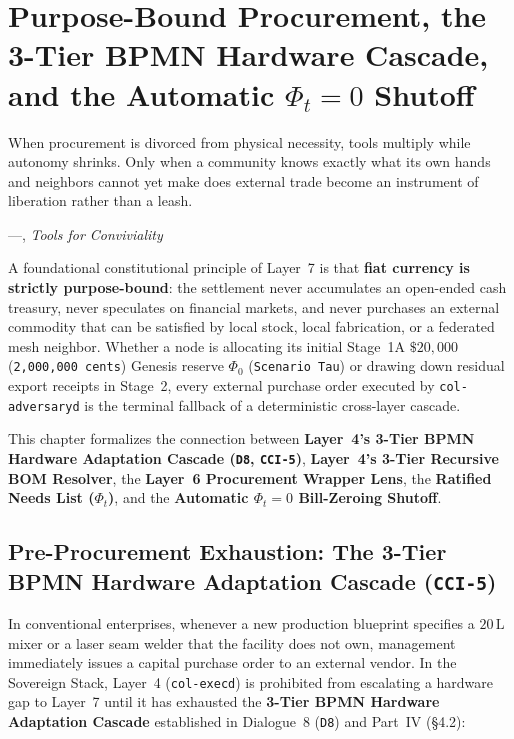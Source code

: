 \chapter{Purpose-Bound Procurement, the 3-Tier BPMN Hardware Cascade, and the Automatic \texorpdfstring{$\Phi_t = 0$}{Phi\_t = 0} Shutoff}
\label{ch:l7-predictive-procurement}

\epigraph{When procurement is divorced from physical necessity, tools multiply while autonomy shrinks. Only when a community knows exactly what its own hands and neighbors cannot yet make does external trade become an instrument of liberation rather than a leash.}{---\textcite{illich1973}, \textit{Tools for Conviviality}}

A foundational constitutional principle of Layer~7 is that \textbf{fiat currency is strictly purpose-bound}: the settlement never accumulates an open-ended cash treasury, never speculates on financial markets, and never purchases an external commodity that can be satisfied by local stock, local fabrication, or a federated mesh neighbor. Whether a node is allocating its initial Stage~1A $\$20{,}000$ (\texttt{2,000,000 cents}) Genesis reserve $\Phi_0$ (\texttt{Scenario Tau}) or drawing down residual export receipts in Stage~2, every external purchase order executed by \texttt{col-adversaryd} is the terminal fallback of a deterministic cross-layer cascade.

This chapter formalizes the connection between \textbf{Layer~4's 3-Tier BPMN Hardware Adaptation Cascade (\texttt{D8}, \texttt{CCI-5})}, \textbf{Layer~4's 3-Tier Recursive BOM Resolver}, the \textbf{Layer~6 Procurement Wrapper Lens}, the \textbf{Ratified Needs List ($\Phi_t$)}, and the \textbf{Automatic $\Phi_t = 0$ Bill-Zeroing Shutoff}.

\section{Pre-Procurement Exhaustion: The 3-Tier BPMN Hardware Adaptation Cascade (\texttt{CCI-5})}
\label{sec:l7-bpmn-cascade-gate}

In conventional enterprises, whenever a new production blueprint specifies a $20\,\mathrm{L}$ mixer or a laser seam welder that the facility does not own, management immediately issues a capital purchase order to an external vendor. In the Sovereign Stack, Layer~4 (\texttt{col-execd}) is prohibited from escalating a hardware gap to Layer~7 until it has exhausted the \textbf{3-Tier BPMN Hardware Adaptation Cascade} established in Dialogue~8 (\texttt{D8}) and Part~IV (\S 4.2):

